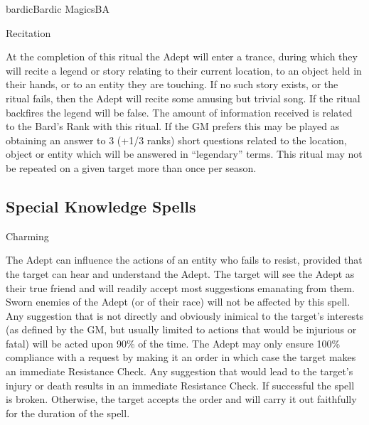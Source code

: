 \begin{college}[2.1]{bardic}{Bardic Magics}{BA}
\begin{ritual}[Q-2]{Recitation}

\begin{effects}
At the completion of this ritual the Adept will enter a trance, during
which they will recite a legend or story relating to their current
location, to an object held in their hands, or to an entity they are
touching. If no such story exists, or the ritual fails, then the Adept
will recite some amusing but trivial song. If the ritual backfires the
legend will be false. The amount of information received is related to
the Bard's Rank with this ritual. If the GM prefers this may be played
as obtaining an answer to 3 (+1/3 ranks) short questions related to
the location, object or entity which will be answered in ``legendary''
terms. This ritual may not be repeated on a given target more than
once per season.
\end{effects}
\end{ritual}

\subsection{Special Knowledge Spells}

\begin{spell}[S-1]{Charming}

\begin{effects}
The Adept can influence the actions of an entity who fails to resist,
provided that the target can hear and understand the Adept. The target
will see the Adept as their true friend and will readily accept most
suggestions emanating from them. Sworn enemies of the Adept (or of
their race) will not be affected by this spell. Any suggestion that is
not directly and obviously inimical to the target's interests (as
defined by the GM, but usually limited to actions that would be
injurious or fatal) will be acted upon 90\% of the time. The Adept may
only ensure 100\% compliance with a request by making it an order in
which case the target makes an immediate Resistance Check.  Any
suggestion that would lead to the target's injury or death results in
an immediate Resistance Check. If successful the spell is broken.
Otherwise, the target accepts the order and will carry it out
faithfully for the duration of the spell.
\end{effects}
\end{spell}


\end{college}
